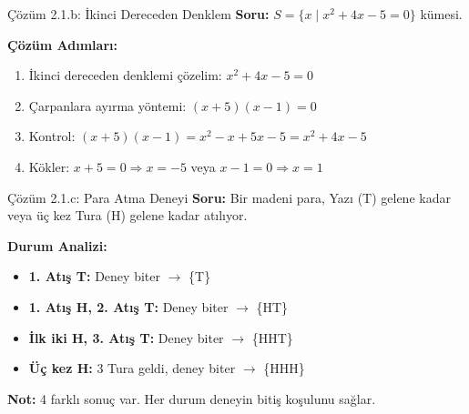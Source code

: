 \documentclass[light]{lutbeamer}
\begin{document}
\begin{frame}{Çözüm 2.1.b: İkinci Dereceden Denklem}
    \color{blue}
    \textbf{Soru:} $S = \{x \mid x^2 + 4x - 5 = 0\}$ kümesi.
    
    \vspace{0.3cm}
    \textbf{Çözüm Adımları:}
    \begin{enumerate}
        \item İkinci dereceden denklemi çözelim: $x^2 + 4x - 5 = 0$
        \item Çarpanlara ayırma yöntemi: $(x + 5)(x - 1) = 0$
        \item Kontrol: $(x+5)(x-1) = x^2 - x + 5x - 5 = x^2 + 4x - 5$ \checkmark
        \item Kökler: $x + 5 = 0 \Rightarrow x = -5$ veya $x - 1 = 0 \Rightarrow x = 1$
    \end{enumerate}
    
    \vspace{0.3cm}
    \begin{center}
    \end{center}
\end{frame}

\begin{frame}{Çözüm 2.1.c: Para Atma Deneyi}
    \color{blue}
    \textbf{Soru:} Bir madeni para, Yazı (T) gelene kadar veya üç kez Tura (H) gelene kadar atılıyor.
    
    \vspace{0.3cm}
    \textbf{Durum Analizi:}
    \begin{itemize}
        \item \textbf{1. Atış T:} Deney biter $\rightarrow$ \{T\}
        \item \textbf{1. Atış H, 2. Atış T:} Deney biter $\rightarrow$ \{HT\}
        \item \textbf{İlk iki H, 3. Atış T:} Deney biter $\rightarrow$ \{HHT\}
        \item \textbf{Üç kez H:} 3 Tura geldi, deney biter $\rightarrow$ \{HHH\}
    \end{itemize}
    
    \vspace{0.3cm}
    \begin{center}
    \end{center}
    
    \textbf{Not:} 4 farklı sonuç var. Her durum deneyin bitiş koşulunu sağlar.
\end{frame}
\end{document}
